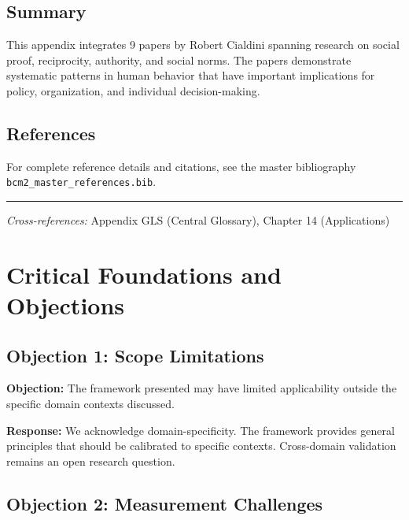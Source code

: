 \subsection{Summary}

This appendix integrates 9 papers by Robert Cialdini
spanning research on social proof, reciprocity, authority, and social norms.
The papers demonstrate systematic patterns in human behavior that have important
implications for policy, organization, and individual decision-making.

\subsection{References}

For complete reference details and citations, see the master bibliography
\texttt{bcm2\_master\_references.bib}.

\vspace{1em}
\hrule
\vspace{0.5em}

\noindent\textit{Cross-references:}
Appendix GLS (Central Glossary), Chapter 14 (Applications)



\section{Critical Foundations and Objections}
\label{sec:cia-foundations}

\subsection{Objection 1: Scope Limitations}

\textbf{Objection:} The framework presented may have limited applicability
outside the specific domain contexts discussed.

\textbf{Response:} We acknowledge domain-specificity. The framework provides
general principles that should be calibrated to specific contexts. Cross-domain
validation remains an open research question.

\subsection{Objection 2: Measurement Challenges}

